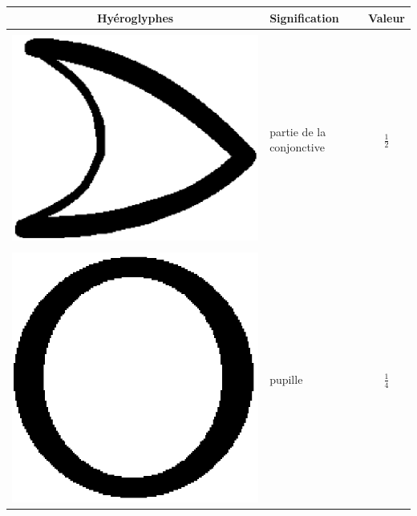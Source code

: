 \documentclass[letterpaper, 12pt]{article}
\begin{document}
\begin{center}
\begin{tabular}{|c|l|c|}\hline
{\bf Hy\'eroglyphes} & {\bf Signification} & {\bf Valeur}\\ \hline
& & \\
\includegraphics[scale=0.1]{conjonctivedemi.eps} & partie de la conjonctive & {\Large$\frac{1}{2}$}\\[2mm] \hline
& & \\
\includegraphics[scale=0.1]{pupille.eps} & pupille & {\Large$\frac{1}{4}$}\\[2mm] \hline

\end{tabular}
\end{center}
\end{document}
